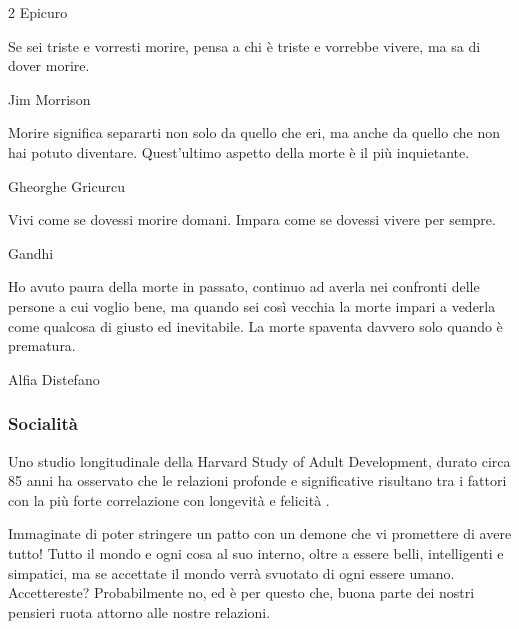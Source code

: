 \documentclass[12pt]{book} %
\begin{document}
\begin{mdframed}[linewidth=1pt]
\begin{multicols}{2}
Epicuro

\bigskip

Se sei triste e vorresti morire, pensa a chi è triste e vorrebbe vivere, ma sa di dover morire.

Jim Morrison

\bigskip

Morire significa separarti non solo da quello che eri, ma anche da quello che non hai potuto diventare. Quest’ultimo aspetto della morte è il più inquietante.

Gheorghe Gricurcu

\bigskip

Vivi come se dovessi morire domani. Impara come se dovessi vivere per sempre.

Gandhi

\bigskip

Ho avuto paura della morte in passato, continuo ad averla nei confronti delle persone a cui voglio bene, ma quando sei così vecchia la morte impari a vederla come qualcosa di giusto ed inevitabile. La morte spaventa davvero solo quando è prematura. 

Alfia Distefano
\end{multicols}
\end{mdframed}

\subsubsection{Socialità}

Uno studio longitudinale della Harvard Study of Adult Development, durato circa 85 anni ha osservato che le relazioni profonde e significative risultano tra i fattori con la più forte correlazione con longevità e felicità .
 
Immaginate di poter stringere un patto con un demone che vi promettere di avere tutto! Tutto il mondo e ogni cosa al suo interno, oltre a essere belli, intelligenti e simpatici, ma se accettate il mondo verrà svuotato di ogni essere umano.
Accettereste? Probabilmente no, ed è per questo che, buona parte dei nostri pensieri ruota attorno alle nostre relazioni.
\end{document}
